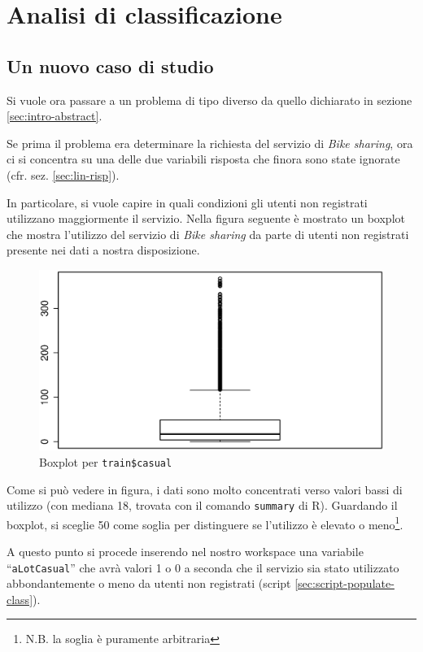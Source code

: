 \section{Analisi di classificazione}\label{sec:class}

\subsection{Un nuovo caso di studio}

Si vuole ora passare a un problema di tipo diverso da quello dichiarato in
sezione \ref{sec:intro-abstract}.

Se prima il problema era determinare la richiesta del servizio di \emph{Bike
sharing}, ora ci si concentra su una delle due variabili risposta che finora
sono state ignorate (cfr. sez. \ref{sec:lin-risp}).

In particolare, si vuole capire in quali condizioni gli utenti non registrati
utilizzano maggiormente il servizio. Nella figura seguente è mostrato un
boxplot che mostra l'utilizzo del servizio di \emph{Bike sharing} da parte di
utenti non registrati presente nei dati a nostra disposizione.

\begin{figure}[H]
  \centering
  \includegraphics[width=.5\columnwidth]{images/class/boxplot-casual.eps}
  \caption{Boxplot per \texttt{train\$casual}}
  \label{fig:simplest-linear-model}
\end{figure}

Come si può vedere in figura, i dati sono molto concentrati verso valori bassi
di utilizzo (con mediana 18, trovata con il comando \texttt{summary} di R).
Guardando il boxplot, si sceglie 50 come soglia per distinguere se l'utilizzo
è elevato o meno\footnote{N.B. la soglia è puramente arbitraria}.

A questo punto si procede inserendo nel nostro workspace una variabile
``\texttt{aLotCasual}'' che avrà valori 1 o 0 a seconda che il servizio sia
stato utilizzato abbondantemente o meno da utenti non registrati (script
\ref{sec:script-populate-class}).


